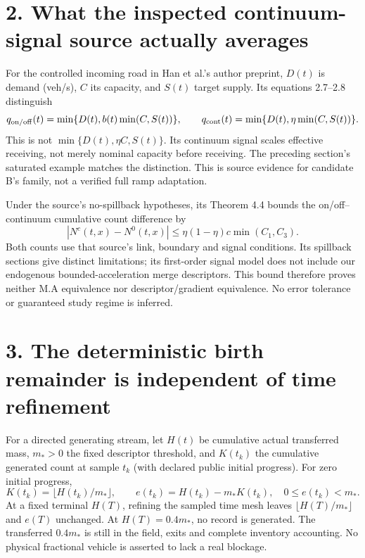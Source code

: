\documentclass[11pt,a4paper]{article}
\begin{document}
\newpage
\section*{2. What the inspected continuum-signal source actually averages}
For the controlled incoming road in Han et al.'s author preprint,
$D(t)$ is demand (veh/s), $C$ its capacity, and $S(t)$ target supply.
Its equations 2.7--2.8 distinguish
\begin{equation}
q_{\rm on/off}(t)=\min\{D(t),b(t)\min(C,S(t))\},\qquad
q_{\rm cont}(t)=\min\{D(t),\eta\min(C,S(t))\}.
\end{equation}
This is not $\min\{D(t),\eta C,S(t)\}$. Its continuum signal scales
effective receiving, not merely nominal capacity before receiving.
The preceding section's saturated example matches the distinction. This is
source evidence for candidate B's family, not a verified full ramp adaptation.

Under the source's no-spillback hypotheses, its Theorem 4.4 bounds the
on/off--continuum cumulative count difference by
\begin{equation}
\left|N^{c}(t,x)-N^0(t,x)\right|
\le \eta(1-\eta)c\min(C_1,C_3).
\end{equation}
Both counts use that source's link, boundary and signal conditions. Its
spillback sections give distinct limitations; its first-order signal model
does not include our endogenous bounded-acceleration merge descriptors.
This bound therefore proves neither M.A equivalence nor descriptor/gradient
equivalence. No error tolerance or guaranteed study regime is inferred.

\section*{3. The deterministic birth remainder is independent of time refinement}
For a directed generating stream, let $H(t)$ be cumulative actual transferred
mass, $m_*>0$ the fixed descriptor threshold, and $K(t_k)$ the cumulative
generated count at sample $t_k$ (with declared public initial progress).
For zero initial progress,
\begin{equation}
K(t_k)=\lfloor H(t_k)/m_*\rfloor,\qquad
e(t_k)=H(t_k)-m_*K(t_k),\quad 0\le e(t_k)<m_*.
\end{equation}
At a fixed terminal $H(T)$, refining the sampled time mesh leaves
$\lfloor H(T)/m_*\rfloor$ and $e(T)$ unchanged. At $H(T)=0.4m_*$,
no record is generated. The transferred $0.4m_*$ is still in the field,
exits and complete inventory accounting. No physical fractional vehicle is
asserted to lack a real blockage.
\end{document}
